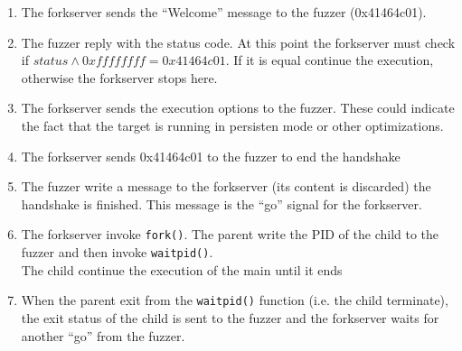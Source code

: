             \begin{enumerate}
                \item The forkserver sends the ``Welcome'' message to the fuzzer (0x41464c01).
                \item The fuzzer reply with the status code. At this point the forkserver must check if $status \land 0xffffffff = 0x41464c01$.
                        If it is equal continue the execution, otherwise the forkserver stops here.
                \item The forkserver sends the execution options to the fuzzer. 
                    These could indicate the fact that the target is running in persisten mode or other optimizations.
                \item The forkserver sends 0x41464c01 to the fuzzer to end the handshake
                \item The fuzzer write a message to the forkserver (its content is discarded) the handshake is finished.
                            This message is the ``go'' signal for the forkserver.
                \item The forkserver invoke \texttt{fork()}. The parent write the PID of the child to the fuzzer and then invoke \texttt{waitpid()}.\\
                        The child continue the execution of the main until it ends
                \item When the parent exit from the \texttt{waitpid()} function (i.e. the child terminate),  the exit status 
                of the child is sent to the fuzzer and the forkserver waits for another ``go'' from the fuzzer.
            \end{enumerate}        
